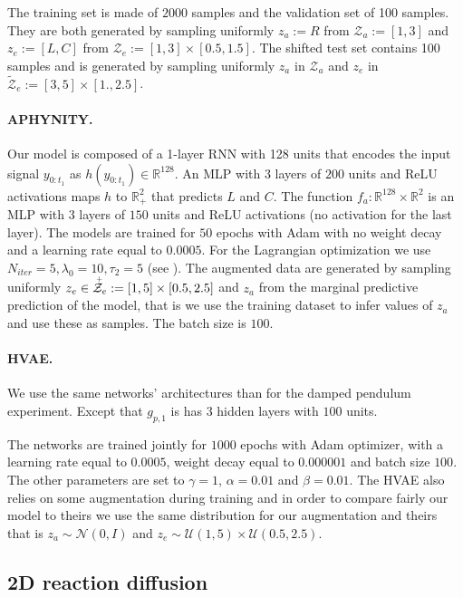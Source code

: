 \documentclass{article}
\begin{document}
The training set is made of $2000$ samples and the validation set of 100 samples. They are both generated by sampling uniformly $z_a := R$ from $\mathcal{Z}_a := \left[ 1, 3 \right]$ and $z_e := \left[L, C\right]$ from $\mathcal{Z}_e := \left[ 1, 3 \right] \times \left[ 0.5, 1.5 \right]$. The shifted test set contains 100 samples and is generated by sampling uniformly $z_a$ in $\mathcal{Z}_a$ and $z_e$ in $\tilde{\mathcal{Z}}_e := \left[ 3, 5 \right] \times \left[ 1., 2.5 \right]$.
\paragraph{APHYNITY.}
Our model is composed of a 1-layer RNN with 128 units that encodes the input signal $y_{0:t_1}$ as $h(y_{0:t_1}) \in \mathbb{R}^{128}$. An MLP with $3$ layers of $200$ units and ReLU activations maps $h$ to $\mathbb{R}_+^2$ that predicts $L$ and $C$. The function $f_a: \mathbb{R}^{128} \times \mathbb{R}^2$ is an MLP with $3$ layers of $150$ units and ReLU activations (no activation for the last layer). The models are trained for $50$ epochs with Adam with no weight decay and a learning rate equal to $0.0005$. For the Lagrangian optimization we use $N_{iter}=5, \lambda_0=10, \tau_2 = 5$ (see \citep{APHYNITY}). The augmented data are generated by sampling uniformly $z_e \in \accentset{+}{\mathcal{Z}}_e := \left[1, 5\right] \times \left[0.5, 2.5\right]$ and $z_a$ from the marginal predictive prediction of the model, that is we use the training dataset to infer values of $z_a$ and use these as samples. The batch size is $100$.

\paragraph{HVAE.}
We use the same networks' architectures than for the damped pendulum experiment. Except that $g_{p, 1}$ is has $3$ hidden layers with $100$ units.

The networks are trained jointly for $1000$ epochs with Adam optimizer, with a learning rate equal to $0.0005$, weight decay equal to $0.000001$ and batch size $100$. The other parameters are set to $\gamma = 1$, $\alpha=0.01$ and $\beta=0.01$. The HVAE also relies on some augmentation during training and in order to compare fairly our model to theirs we use the same distribution for our augmentation and theirs that is $z_a \sim \mathcal{N}(0, I)$ and $z_e \sim \mathcal{U}(1, 5) \times \mathcal{U}(0.5, 2.5)$. 

\subsection{2D reaction diffusion}
\end{document}

